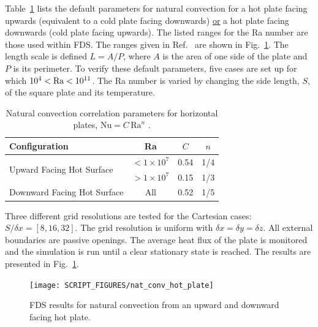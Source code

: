 \documentclass[11pt]{book}
\begin{document}
Table~\ref{tab:nat_conv_horizontal_default} lists the default parameters for natural convection for a hot plate facing upwards (equivalent to a cold plate facing downwards) \underline{or} a hot plate facing downwards (cold plate facing upwards). The listed ranges for the Ra number are those used within FDS. The ranges given in Ref.~\cite{Incropera:1} are shown in Fig.~\ref{fig_nat_conv_hot_plate}. The length scale is defined $L=A/P$, where $A$ is the area of one side of the plate and $P$ is its perimeter. To verify these default parameters, five cases are set up for which $10^4 < {\rm Ra} < 10^{11}$. The Ra number is varied by changing the side length, $S$, of the square plate and its temperature.

\begin{table}[h]
\centering
\caption[Natural convection correlation parameters for horizontal plates]{Natural convection correlation parameters for horizontal plates, $\mathrm{Nu}=C \, \mathrm{Ra}^n$ \cite{Incropera:1}.}
\label{tab:nat_conv_horizontal_default}
\begin{tabular}{lccc}
Configuration                                & Ra                       & $C$   & $n$  \\
\hline
\multirow{2}{*}{Upward Facing Hot Surface}   & $ <1 \times 10^7$        & 0.54  & 1/4  \\
                                             & $ >1 \times 10^7$        & 0.15  & 1/3  \\
Downward Facing Hot Surface &  All                                      & 0.52  & 1/5  \\
\end{tabular}
\end{table}

Three different grid resolutions are tested for the Cartesian cases: $S/\delta x = [8,16,32]$.  The grid resolution is uniform with $\delta x = \delta y = \delta z$. All external boundaries are passive openings. The average heat flux of the plate is monitored and the simulation is run until a clear stationary state is reached.  The results are presented in Fig.~\ref{fig_nat_conv_hot_plate}.

\begin{figure}[h]
   \centering
   \texttt{[image: SCRIPT\_FIGURES/nat\_conv\_hot\_plate]}
   \caption[Nusselt correlation natural convection from a hot, horizontal plate]{FDS results for natural convection from an upward and downward facing hot plate.}
   \label{fig_nat_conv_hot_plate}
\end{figure}
\end{document}
